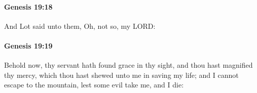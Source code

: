 		\paragraph{Genesis 19:18} %
			\label{GENESIS-19-18}

			And Lot said unto them, Oh, not so, my LORD:


		\paragraph{Genesis 19:19} %
			\label{GENESIS-19-19}

			Behold now, thy servant hath found grace in thy sight, and thou hast magnified thy mercy, which thou hast shewed unto me in saving my life; and I cannot escape to the mountain, lest some evil take me, and I die:


